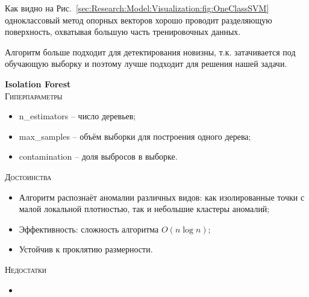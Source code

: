 \documentclass[12pt]{article}
\begin{document}
    \par Как видно на Рис.~\ref{sec:Research:Model:Visualization:fig:OneClassSVM} одноклассовый метод опорных векторов хорошо проводит разделяющую поверхность, охватывая большую часть тренировочных данных. \\

    \par Алгоритм больше подходит для детектирования новизны, т.к. затачивается под обучающую выборку и поэтому лучше подходит для решения нашей задачи.

    \newpage


    \textbf{Isolation Forest} \\

    \noindent \textsc{Гиперпараметры}
    \begin{itemize}
        \item n\_estimators – число деревьев;
        \item max\_samples – объём выборки для построения одного дерева;
        \item contamination – доля выбросов в выборке.
    \end{itemize}

    \noindent \textsc{Достоинства}
    \begin{itemize}
        \item Алгоритм распознаёт аномалии различных видов: как изолированные точки с малой локальной плотностью, так и небольшие кластеры аномалий;
        \item Эффективность: сложность алгоритма $ O(n \log n) $;
        \item Устойчив к проклятию размерности.
    \end{itemize}
    
    \noindent \textsc{Недостатки}
    \begin{itemize}
        \item 
    \end{itemize}
\end{document}
